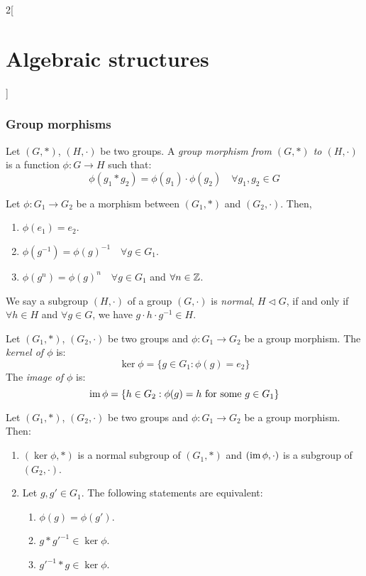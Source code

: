 \documentclass[../../../main.tex]{subfiles}
\begin{document}
\begin{multicols}{2}[\section{Algebraic structures}]
  \subsubsection*{Group morphisms}
  \begin{definition}\label{AS-groupmorphism}
    Let $(G,*)$, $(H,\cdot)$ be two groups. A \textit{group morphism from $(G,*)$ to $(H,\cdot)$} is a function $\phi:G\rightarrow H$ such that: $$\phi(g_1*g_2)=\phi(g_1)\cdot\phi(g_2)\quad\forall g_1,g_2\in G$$
  \end{definition}
  \begin{lemma}
    Let $\phi:G_1\rightarrow G_2$ be a morphism between $(G_1,*)$ and $(G_2,\cdot)$. Then,
    \begin{enumerate}
      \item $\phi(e_1)=e_2$.
      \item $\phi(g^{-1})=\phi(g)^{-1}\quad\forall g\in G_1$.
      \item $\phi(g^n)=\phi(g)^n\quad\forall g\in G_1$ and $\forall n\in\mathbb{Z} $.
    \end{enumerate}
  \end{lemma}
  \begin{definition}
    We say a subgroup $(H,\cdot)$ of a group $(G,\cdot)$ is \textit{normal}, $H\lhd G$, if and only if $\forall h\in H$ and $\forall g\in G$, we have $g\cdot h\cdot g^{-1}\in H$.
  \end{definition}
  \begin{definition}
    Let $(G_1,*)$, $(G_2,\cdot)$ be two groups and $\phi:G_1\rightarrow G_2$ be a group morphism. The \textit{kernel of $\phi$} is: $$\ker\phi=\{g\in G_1:\phi(g)=e_2\}$$
    The \textit{image of $\phi$} is: $$\operatorname{im}\phi=\{h\in G_2:\phi(g)=h\text{ for some }g\in G_1\}$$
  \end{definition}
  \begin{prop}
    Let $(G_1,*)$, $(G_2,\cdot)$ be two groups and $\phi:G_1\rightarrow G_2$ be a group morphism. Then:
    \begin{enumerate}
      \item $(\ker\phi,*)$ is a normal subgroup of $(G_1,*)$ and $(\operatorname{im}\phi,\cdot)$ is a subgroup of $(G_2,\cdot)$.
      \item Let $g,g'\in G_1$. The following statements are equivalent:
            \begin{enumerate}
              \item $\phi(g)=\phi(g')$.
              \item $g*g'^{-1}\in\ker\phi$.
              \item $g'^{-1}*g\in\ker\phi$.

\end{enumerate}
\end{enumerate}
\end{prop}
\end{multicols}
\end{document}
